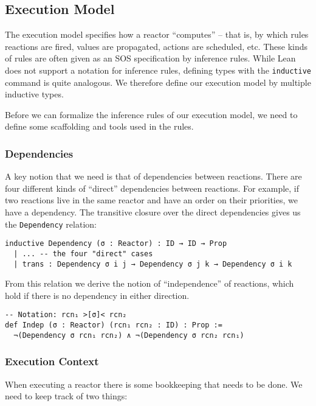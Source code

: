 \subsection{Execution Model}

The execution model specifies how a reactor ``computes'' -- that is, by which rules reactions are fired, values are propagated, actions are scheduled, etc. 
These kinds of rules are often given as an SOS specification by inference rules.
While Lean does not support a notation for inference rules, defining types with the \lstinline{inductive} command is quite analogous.
We therefore define our execution model by multiple inductive types.

Before we can formalize the inference rules of our execution model, we need to define some scaffolding and tools used in the rules.

\subsubsection{Dependencies}

A key notion that we need is that of dependencies between reactions. 
There are four different kinds of ``direct'' dependencies between reactions.
For example, if two reactions live in the same reactor and have an order on their priorities, we have a dependency.
The transitive closure over the direct dependencies gives us the \lstinline{Dependency} relation:

\begin{lstlisting}
inductive Dependency (σ : Reactor) : ID → ID → Prop
  | ... -- the four "direct" cases
  | trans : Dependency σ i j → Dependency σ j k → Dependency σ i k
\end{lstlisting}

From this relation we derive the notion of ``independence'' of reactions, which hold if there is no dependency in either direction.

\begin{lstlisting}
-- Notation: rcn₁ >[σ]< rcn₂
def Indep (σ : Reactor) (rcn₁ rcn₂ : ID) : Prop :=
  ¬(Dependency σ rcn₁ rcn₂) ∧ ¬(Dependency σ rcn₂ rcn₁)
\end{lstlisting}

\subsubsection{Execution Context}

When executing a reactor there is some bookkeeping that needs to be done.
We need to keep track of two things:

